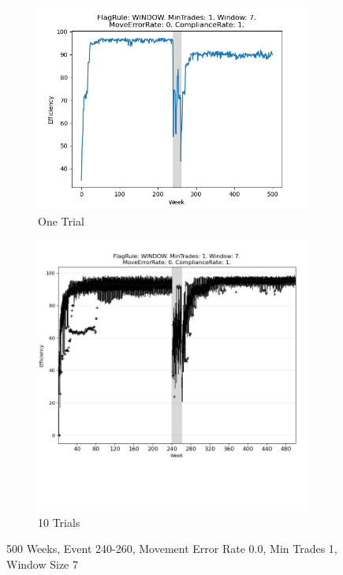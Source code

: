 \documentclass{article}%
\begin{document}
%


\begin{figure}[!htb]%
\begin{subfigure}[b]{0.45\linewidth}%
\includegraphics[width=\linewidth]{2049fr_WINDOW_mt_1_ws_7_er_0_cr_1_t1.png}%
\caption{One Trial}%
\end{subfigure}%
\begin{subfigure}[b]{0.45\linewidth}%
\includegraphics[clip,width=\linewidth,trim=0 4cm 0 0]{2049fr_WINDOW_mt_1_ws_7_er_0_cr_1_t10.png}%
\caption{10 Trials}%
\end{subfigure}%
\caption{500 Weeks, Event 240{-}260, Movement Error Rate 0.0, Min Trades 1, Window Size 7}%
\end{figure}
\end{document}
